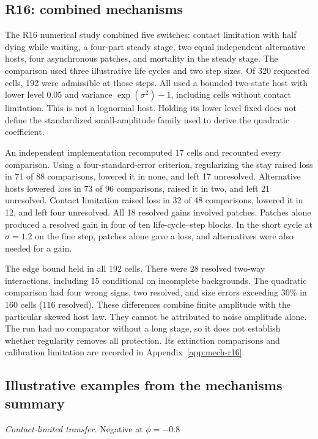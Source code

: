 \subsection{R16: combined mechanisms}\label{esm:trim-r16}
The R16 numerical study combined five switches: contact limitation with half dying while waiting, a four-part steady stage, two equal independent alternative hosts, four asynchronous patches, and mortality in the steady stage. The comparison used three illustrative life cycles and two step sizes. Of 320 requested cells, 192 were admissible at those steps. All used a bounded two-state host with lower level 0.05 and variance \(\exp(\sigma^2)-1\), including cells without contact limitation. This is not a lognormal host. Holding its lower level fixed does not define the standardized small-amplitude family used to derive the quadratic coefficient.

An independent implementation recomputed 17 cells and recounted every comparison. Using a four-standard-error criterion, regularizing the stay raised loss in 71 of 88 comparisons, lowered it in none, and left 17 unresolved. Alternative hosts lowered loss in 73 of 96 comparisons, raised it in two, and left 21 unresolved. Contact limitation raised loss in 32 of 48 comparisons, lowered it in 12, and left four unresolved. All 18 resolved gains involved patches. Patches alone produced a resolved gain in four of ten life-cycle--step blocks. In the short cycle at \(\sigma=1.2\) on the fine step, patches alone gave a loss, and alternatives were also needed for a gain.

The edge bound held in all 192 cells. There were 28 resolved two-way interactions, including 15 conditional on incomplete backgrounds. The quadratic comparison had four wrong signs, two resolved, and size errors exceeding 30\% in 160 cells (116 resolved). These differences combine finite amplitude with the particular skewed host law. They cannot be attributed to noise amplitude alone. The run had no comparator without a long stage, so it does not establish whether regularity removes all protection. Its extinction comparisons and calibration limitation are recorded in Appendix~\ref{app:mech-r16}.

\subsection{Illustrative examples from the mechanisms summary}\label{esm:trim-mechanisms-examples}
\noindent\textit{Contact-limited transfer.} Negative at \(\phi=-0.8\)

